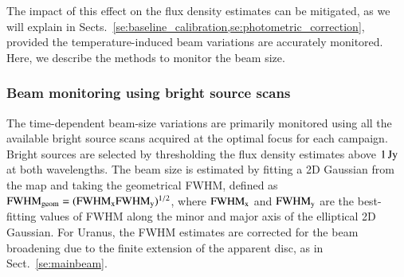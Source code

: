The impact of this effect on the flux density estimates can be
mitigated, as we will explain in
Sects.~\ref{se:baseline_calibration,se:photometric_correction},
provided the temperature-induced beam variations are accurately
monitored. Here, we describe the methods to monitor the beam size.   


\subsubsection{Beam monitoring using bright source scans}
\label{se:beam_monitoring_otf}

The time-dependent beam-size variations are primarily monitored using
all the available bright source scans acquired at the optimal focus
for each campaign. Bright sources are selected by thresholding the
flux density estimates above $1\,\rm{Jy}$ at both wavelengths.
The beam size is estimated by fitting a 2D Gaussian from the map and
taking the geometrical FWHM, defined as 
$\rm{FWHM}_{\rm{geom}} = (\rm{FWHM}_x \rm{FWHM}_y)^{1/2}$, where
$\rm{FWHM}_x$ and $\rm{FWHM}_y$ are the best-fitting values of FWHM
along the minor and major axis of the elliptical 2D Gaussian.
For Uranus, the FWHM estimates are corrected for the beam broadening due
to the finite extension of the apparent disc, as in Sect.~\ref{se:mainbeam}. 

